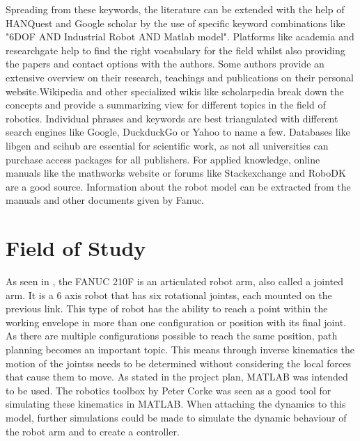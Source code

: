 Spreading from these keywords, the literature can be extended with the help of HANQuest and Google scholar by the use of specific keyword combinations like "6DOF AND Industrial Robot AND Matlab model". Platforms like academia and researchgate help to find the right vocabulary for the field whilst also providing the papers and contact options with the authors. 
Some authors provide an extensive overview on their research, teachings and publications on their personal website.​
Wikipedia and other specialized wikis like scholarpedia break down the concepts and provide a summarizing view for different topics in the field of robotics. Individual phrases and keywords are best triangulated with different search engines like Google, DuckduckGo or Yahoo to name a few. Databases like libgen and scihub are essential for scientific work, as not all universities can purchase access packages for all publishers. For applied knowledge, online manuals like the mathworks website or forums like Stackexchange and RoboDK are a good source. Information about the robot model can be extracted from the manuals and other documents given by Fanuc.




\section{Field of Study}

As seen in %
\cite{IndustrialRobotArm}, the FANUC 210F is an articulated robot arm, also called a jointed arm. It is a 6 axis robot that has six rotational \glspl{joints}, each mounted on the previous \gls{link}. %
This type of robot has the ability to reach a point within the working envelope in more than one configuration or position with its final joint. 
As there are multiple configurations possible to reach the same position, path planning becomes an important topic. 
This means through inverse kinematics  the motion of the \glspl{joints} needs to be determined without considering the local forces that cause them to move.
As stated in the project plan, MATLAB was intended to be used.
The robotics toolbox by Peter Corke was seen as a good tool for simulating these kinematics in MATLAB. 
When attaching the dynamics to this model, further simulations could be made to simulate the dynamic behaviour of the robot arm and to create a controller. 

